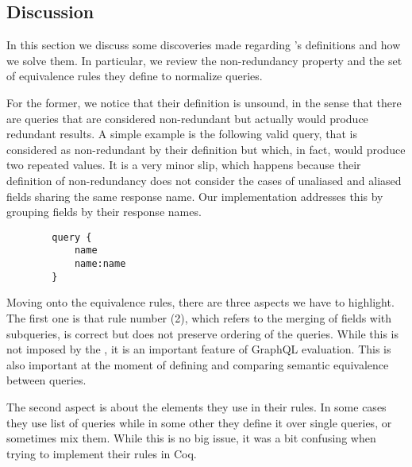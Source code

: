 \iffalse
\begin{verbatim}
query {
    name
    name:name
}
\end{verbatim}
\fi

\subsection{Discussion}\label{subsec:discussion}

In this section we discuss some discoveries made regarding \HP{}'s definitions and how we solve them. In particular, we review the non-redundancy property and the set of equivalence rules they define to normalize queries.

For the former, we notice that their definition is unsound, in the sense that there are queries that are considered non-redundant but actually would produce redundant results. A simple example is the following valid query, that is considered as non-redundant by their definition but which, in fact, would produce two repeated values. It is a very minor slip, which happens because their definition of non-redundancy does not consider the cases of unaliased and aliased fields sharing the same response name. Our implementation addresses this by grouping fields by their response names.

\begin{verbatim}
        query {
            name
            name:name
        }
\end{verbatim}


Moving onto the equivalence rules, there are three aspects we have to highlight. The first one is that rule number (2), which refers to the merging of fields with subqueries, is correct but does not preserve ordering of the queries. While this is not imposed by the \spec{}, it is an important feature of GraphQL evaluation. This is also important at the moment of defining and comparing semantic equivalence between queries.

The second aspect is about the elements they use  in their rules. In some cases they use list of queries while in some other they define it over single queries, or sometimes mix them. While this is no big issue, it was a bit confusing when trying to implement their rules in Coq.

